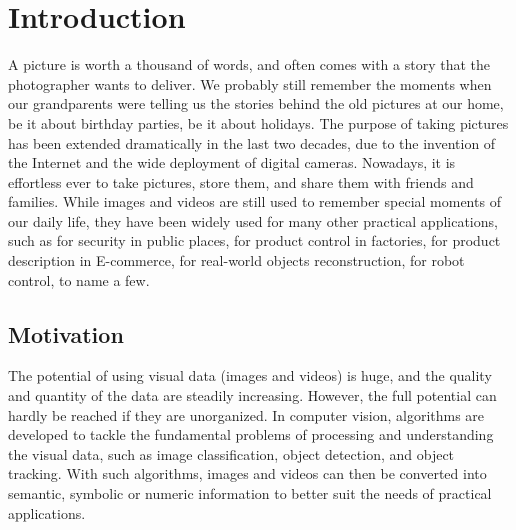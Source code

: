 \chapter{Introduction}

A picture is worth a thousand of words, and often comes with a story
that the photographer wants to deliver. We probably still remember
the moments when our grandparents were telling us the stories behind the
old pictures at our home, be it about birthday parties, be it about
holidays. The purpose of taking pictures has been extended
dramatically in the last two decades, due to the invention of the Internet and the wide 
deployment of digital cameras.  Nowadays, it is effortless ever to take pictures, store them, and share them with friends and
families.  While images and videos are still used to remember special moments of our daily life,  they have been widely used for many other practical applications, such as for security in public places, for product control in factories, for
product description in E-commerce, for real-world objects reconstruction, for robot control, to name a few. 

\section{Motivation}
The potential of using visual data (images and videos) is huge,  and the quality and quantity of the data are
steadily increasing.  However,  the full potential can hardly be reached if they are unorganized. In computer vision,
algorithms are developed to tackle the fundamental problems of processing and understanding the visual data, such as image classification, object detection, and object tracking. 
With such algorithms, images and videos can then be
converted into semantic, symbolic or numeric information to better suit the needs of practical applications. 


